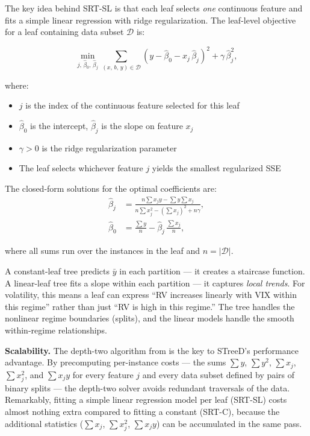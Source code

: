 The key idea behind SRT-SL is that each leaf selects \emph{one} continuous
feature and fits a simple linear regression with ridge regularization.  The
leaf-level objective for a leaf containing data subset $\mathcal{D}$ is:

\begin{equation}\label{eq:streed-sl}
  \min_{j,\,\hat{\beta}_0,\,\hat{\beta}_j}
    \sum_{(x,\,b,\,y) \in \mathcal{D}}
    (y - \hat{\beta}_0 - x_j\,\hat{\beta}_j)^2
    + \gamma\,\hat{\beta}_j^2,
\end{equation}

\noindent where:
\begin{itemize}[leftmargin=1.8em]
  \item $j$ is the index of the continuous feature selected for this leaf
  \item $\hat{\beta}_0$ is the intercept,
    $\hat{\beta}_j$ is the slope on feature $x_j$
  \item $\gamma > 0$ is the ridge regularization parameter
  \item The leaf selects whichever feature $j$ yields the smallest
    regularized SSE
\end{itemize}

The closed-form solutions for the optimal coefficients are:
\begin{align}
  \hat{\beta}_j &= \frac{n\sum x_j y - \sum y \sum x_j}
    {n\sum x_j^2 - (\sum x_j)^2 + n\gamma},
    \label{eq:streed-slope}\\
  \hat{\beta}_0 &= \frac{\sum y}{n}
    - \hat{\beta}_j\,\frac{\sum x_j}{n},
    \label{eq:streed-intercept}
\end{align}

\noindent where all sums run over the instances in the leaf and
$n = |\mathcal{D}|$.

\begin{intuition}
A constant-leaf tree predicts $\bar{y}$ in each partition --- it creates a
staircase function.  A linear-leaf tree fits a slope within each
partition --- it captures \emph{local trends}.  For volatility, this means a
leaf can express ``RV increases linearly with VIX within this regime''
rather than just ``RV is high in this regime.''  The tree handles the
nonlinear regime boundaries (splits), and the linear models handle the
smooth within-regime relationships.
\end{intuition}

\textbf{Scalability.}  The depth-two algorithm from
\citet{VanDenBosEtAl2024} is the key to STreeD's performance advantage.
By precomputing per-instance costs --- the sums $\sum y$, $\sum y^2$,
$\sum x_j$, $\sum x_j^2$, and $\sum x_j y$ for every feature $j$ and
every data subset defined by pairs of binary splits --- the depth-two
solver avoids redundant traversals of the data.  Remarkably, fitting
a simple linear regression model per leaf (SRT-SL) costs almost nothing
extra compared to fitting a constant (SRT-C), because the additional
statistics ($\sum x_j$, $\sum x_j^2$, $\sum x_j y$) can be accumulated
in the same pass.

